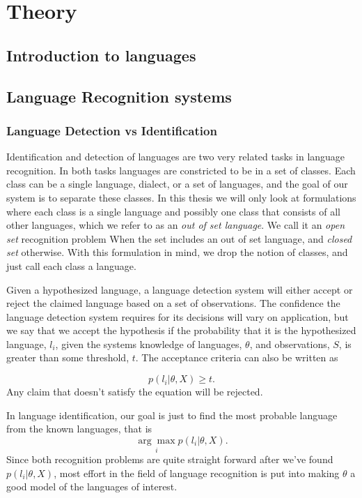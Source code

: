 \chapter{Theory}
\label{sect:Theory}

\section{Introduction to languages}

\section{Language Recognition systems}

\subsection{Language Detection vs Identification}
\label{sect:detvsid}

Identification and detection of languages are two very related tasks in language recognition. In both tasks languages are constricted to be in a set of classes. Each class can be a single language, dialect, or a set of languages, and the goal of our system is to separate these classes. In this thesis we will only look at formulations where each class is a single language and possibly one class that consists of all other languages, which we refer to as an \emph{out of set language}. We call it an \emph{open set} recognition problem When the set includes an out of set language, and \emph{closed set} otherwise. With this formulation in mind, we drop the notion of classes, and just call each class a language. 

Given a hypothesized language, a language detection system will either accept or reject the claimed language based on a set of observations. The confidence the language detection system requires for its decisions will vary on application, but we say that we accept the hypothesis if the probability that it is the hypothesized language, $l_i$, given the systems knowledge of languages, $\theta$, and observations, $S$, is greater than some threshold, $t$. The acceptance criteria can also be written as

\begin{equation*}
p(l_i | \theta, X) \geq t.
\end{equation*}
Any claim that doesn't satisfy the equation will be rejected.

 In language identification, our goal is just to find the most probable language from the known languages, that is
\begin{equation*}
\underset{i}{\arg \max} p(l_i | \theta, X).
\end{equation*}
Since both recognition problems are quite straight forward after we've found $p(l_i | \theta, X)$, most effort in the field of language recognition is put into making $\theta$ a good model of the languages of interest.


